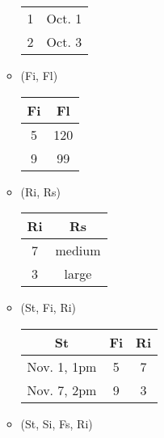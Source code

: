 \documentclass[12pt]{article}
\begin{document}
\begin{enumerate}
\begin{itemize}
\begin{center}
\begin{tabular}{c c}
                    1  & Oct. 1 \\
                    2  & Oct. 3 \\
                    \hline
                  \end{tabular}
                \end{center}
          \item (Fi, Fl)
                \begin{center}
                  \begin{tabular}{c c}
                    \hline
                    Fi & Fl \\
                    \hline
                    5  & 120 \\
                    9  & 99 \\
                    \hline                    
                  \end{tabular}
                \end{center}
          \item (Ri, Rs)
                \begin{center}
                  \begin{tabular}{c c }
                    \hline
                    Ri & Rs \\
                    \hline
                    7  & medium \\
                    3  & large \\
                    \hline
                  \end{tabular}
                \end{center}      
          \item (St, Fi, Ri)
                \begin{center}
                  \begin{tabular}{c c c}
                    \hline
                    St          & Fi & Ri \\
                    \hline
                    Nov. 1, 1pm & 5 & 7 \\
                    Nov. 7, 2pm & 9 & 3 \\
                    \hline
                  \end{tabular}
                \end{center}
          \item (St, Si, Fs, Ri)
                \begin{center}
                  \begin{tabular}{c c c c}
                    \hline

\end{tabular}
\end{center}
\end{itemize}
\end{enumerate}
\end{document}
